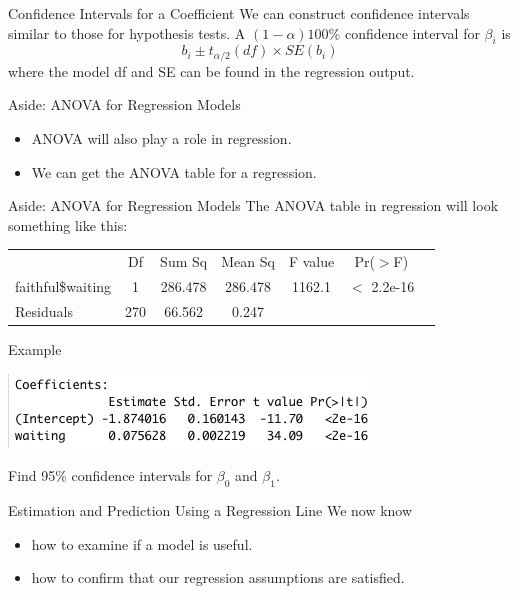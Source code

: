 \begin{frame}{Confidence Intervals for a Coefficient}
    We can construct confidence intervals similar to those for hypothesis tests. A $(1-\alpha)100$\% confidence interval for $\beta_i$ is
    \[
        b_i \pm t_{\alpha/2}(df) \times SE(b_i)
    \]
    where the model df and SE can be found in the regression output.
\end{frame}

\begin{frame}{Aside: ANOVA for Regression Models}
    \begin{itemize}
        \item ANOVA will also play a role in regression.
        \item We can get the ANOVA table for a regression.
    \end{itemize}
\end{frame}

\begin{frame}{Aside: ANOVA for Regression Models}
    The ANOVA table in regression will look something like this: 
    \begin{table}[h]
        \centering
        \begin{tabular}{l cccccc}
             & Df & Sum Sq & Mean Sq & F value  &  Pr($>$F) \\
             \cline{2-6}
            faithful\$waiting & 1 & 286.478 & 286.478 & 1162.1 & $<$ 2.2e-16 \\
            Residuals & 270 & 66.562 & 0.247 & & \\ 
        \end{tabular}
    \end{table}
\end{frame}

\begin{frame}{Example}
    \begin{center}
        \includegraphics[scale=0.6]{images/regcoef.png}
    \end{center}
    Find 95\% confidence intervals for $\beta_0$ and $\beta_1$.
\end{frame}

\begin{frame}{Estimation and Prediction Using a Regression Line}
    We now know
    \begin{itemize}
        \item how to examine if a model is useful.
        \item how to confirm that our regression assumptions are satisfied.
    \end{itemize}
\end{frame}

